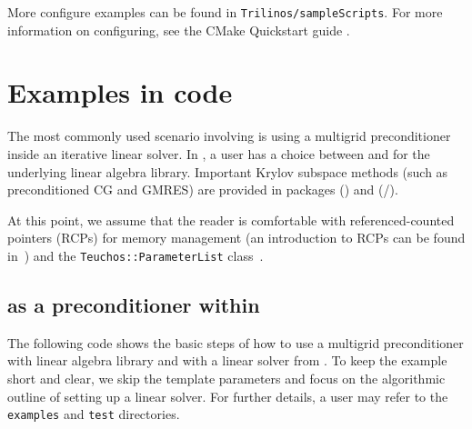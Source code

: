 \noindent
More configure examples can be found in \texttt{Trilinos/sampleScripts}.
For more information on configuring, see the \trilinos CMake Quickstart guide \cite{TrilinosCmakeQuickStart}.

\section{Examples in code}
\label{sec:examples in code}

The most commonly used scenario involving \muelu{} is using a multigrid
preconditioner inside an iterative linear solver. In \trilinos{}, a user has a
choice between \epetra and \tpetra for the underlying linear algebra library.
Important Krylov subspace methods (such as preconditioned CG and GMRES) are
provided in \trilinos{} packages \aztecoo (\epetra{}) and \belos
(\epetra{}/\tpetra{}).

At this point, we assume that the reader is comfortable with \teuchos{} referenced-counted
pointers (RCPs) for memory management (an introduction to RCPs can be found
in~\cite{RCP2010}) and the \texttt{Teuchos::ParameterList} class~\cite{TeuchosURL}.

\subsection{\muelu{} as a preconditioner within \belos}
\label{sec:tpetraexample}
The following code shows the basic steps of how to use a \muelu{}
multigrid preconditioner with \tpetra{} linear algebra library and with a linear
solver from \belos{}. To keep the example short and clear, we skip the template
parameters and focus on the algorithmic outline of setting up
a linear solver. For further details, a user may refer to the \texttt{examples} and
\texttt{test} directories.

